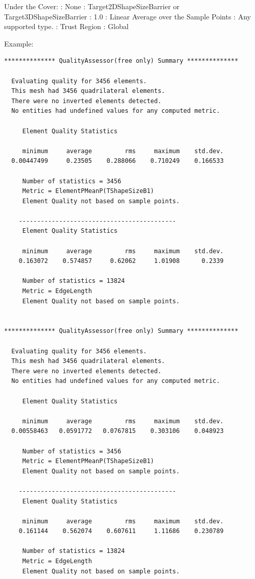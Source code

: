 \noindent Under the Cover: \newline
{}: None \newline
{}: Target2DShapeSizeBarrier or Target3DShapeSizeBarrier \newline
{}: 1.0 \newline
{}: Linear Average over the Sample Points \newline
{}: Any supported type. \newline
{}: Trust Region \newline
{}: Global \newline

\noindent Example: \newline

\begin{verbatim}
************** QualityAssessor(free only) Summary **************

  Evaluating quality for 3456 elements.
  This mesh had 3456 quadrilateral elements.
  There were no inverted elements detected.
  No entities had undefined values for any computed metric.

     Element Quality Statistics

     minimum     average         rms     maximum    std.dev.
  0.00447499     0.23505    0.288066    0.710249    0.166533

     Number of statistics = 3456
     Metric = ElementPMeanP(TShapeSizeB1)
     Element Quality not based on sample points.

    -------------------------------------------
     Element Quality Statistics

     minimum     average         rms     maximum    std.dev.
    0.163072    0.574857     0.62062     1.01908      0.2339

     Number of statistics = 13824
     Metric = EdgeLength
     Element Quality not based on sample points.


************** QualityAssessor(free only) Summary **************

  Evaluating quality for 3456 elements.
  This mesh had 3456 quadrilateral elements.
  There were no inverted elements detected.
  No entities had undefined values for any computed metric.

     Element Quality Statistics

     minimum     average         rms     maximum    std.dev.
  0.00558463   0.0591772   0.0767815    0.303106    0.048923

     Number of statistics = 3456
     Metric = ElementPMeanP(TShapeSizeB1)
     Element Quality not based on sample points.

    -------------------------------------------
     Element Quality Statistics

     minimum     average         rms     maximum    std.dev.
    0.161144    0.562074    0.607611     1.11686    0.230789

     Number of statistics = 13824
     Metric = EdgeLength
     Element Quality not based on sample points.
\end{verbatim}


